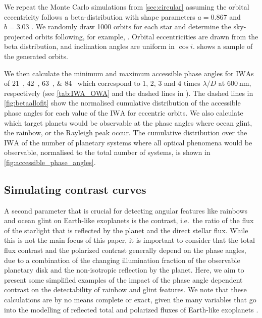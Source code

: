 \documentclass[
    usenatbib,
]{mnras}
\newcommand{\IWA}{\ensuremath{\mathrm{IWA}}}
\begin{document}
We repeat the Monte Carlo simulations from \cref{sec:circular} assuming 
the orbital eccentricity follows a beta-distribution with shape parameters 
$a=0.867$ and $b=3.03$ \citep{2013MNRAS.434L..51K}. 
%
We randomly draw \num{1000} orbits for each star and determine the sky-projected orbits following, for example, \citet{2010exop.book...15M}. 
Orbital eccentricities are drawn from the beta distribution, and 
inclination angles are uniform in $\cos i$. 
 shows a sample of the generated orbits.
%

We then calculate the minimum and maximum accessible phase 
angles for \IWA{}s of \qtylist{21; 42; 63; 84}{\mas} which correspond to 1, 2, 3 and 4 times $\lambda / D$ at $\qty{600}{\nano\meter}$, respectively (see \cref{tab:IWA_OWA} and the dashed lines in ).
%
The dashed lines in \cref{fig:betaallofit} show the normalised cumulative 
distribution of the accessible phase angles for each value of the 
\IWA{} for eccentric orbits. 
%
We also calculate which target planets would be observable at the phase angles where ocean glint, the rainbow, or the Rayleigh peak occur.
%
The cumulative distribution over the \IWA{} of the number of planetary systems where all optical phenomena would be observable, normalised to the total number of systems, is shown in \cref{fig:accessible_phase_angles}.
%

\subsection{Simulating contrast curves}
\label{subsec:2.4}

A second parameter that is crucial for detecting angular features like 
rainbows and ocean glint on Earth-like exoplanets is the contrast, i.e.\ 
the ratio of the flux of the starlight that is reflected by the planet 
and the direct stellar flux. 
%
While this is not the main focus of this paper, it is important to consider that the total flux contrast and the polarized contrast generally 
depend on the phase angles, due to a combination of the changing illumination fraction of the observable planetary disk and the non-isotropic reflection by the planet.
%
Here, we aim to present some simplified examples of the impact of the 
phase angle dependent contrast on the detectability of rainbow and 
glint features. 
%
We note that these calculations are by no means complete or exact, given 
the many variables that go into the modelling of reflected total and
polarized fluxes of Earth-like exoplanets \citep{ treesandstam2019,trees2022}.
%
\end{document}
